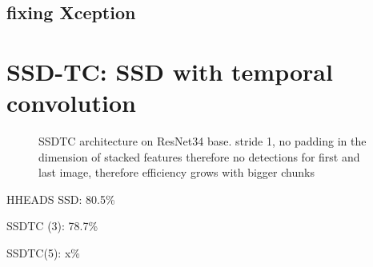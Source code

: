 \subsection{fixing Xception}
\label{sec:fixxception}


\section{SSD-TC: SSD with temporal convolution}
\begin{figure}
    \centering
    \ssdtc
    \caption[SSDTC architecture]{SSDTC architecture on ResNet34 base. stride 1, no padding in the dimension of stacked features therefore no detections for first and last image, therefore efficiency grows with bigger chunks}
    \label{fig:ssdtc}
\end{figure}


HHEADS SSD: 80.5\%

SSDTC (3): 78.7\%

SSDTC(5): x\%
